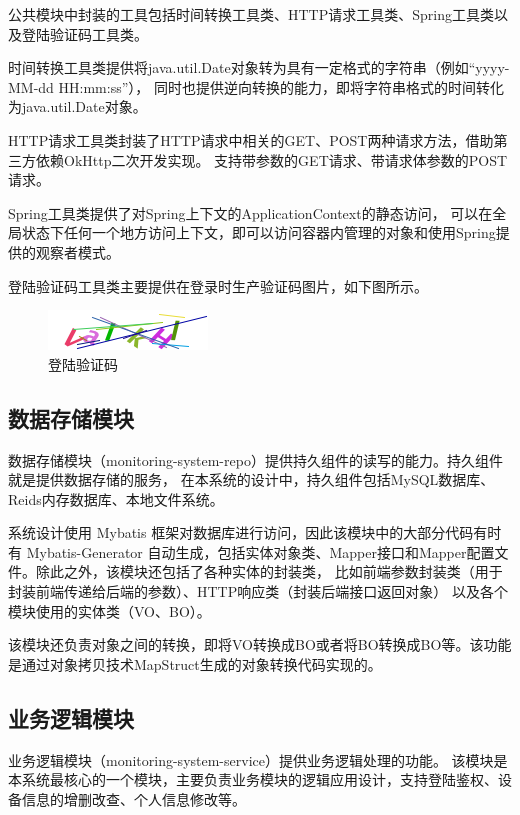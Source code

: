 公共模块中封装的工具包括时间转换工具类、HTTP请求工具类、Spring工具类以及登陆验证码工具类。

时间转换工具类提供将java.util.Date对象转为具有一定格式的字符串（例如“yyyy-MM-dd HH:mm:ss”），
同时也提供逆向转换的能力，即将字符串格式的时间转化为java.util.Date对象。

HTTP请求工具类封装了HTTP请求中相关的GET、POST两种请求方法，借助第三方依赖OkHttp二次开发实现。
支持带参数的GET请求、带请求体参数的POST请求。

Spring工具类提供了对Spring上下文的ApplicationContext的静态访问，
可以在全局状态下任何一个地方访问上下文，即可以访问容器内管理的对象和使用Spring提供的观察者模式。

登陆验证码工具类主要提供在登录时生产验证码图片，如下图所示。

\begin{figure}[ht]
    \centering
    \includegraphics[width=0.5\linewidth]{./Figure/IMG_code.png}
    \caption{登陆验证码}\label{Fig:code}
\end{figure}

\subsection{数据存储模块}
数据存储模块（monitoring-system-repo）提供持久组件的读写的能力。持久组件就是提供数据存储的服务，
在本系统的设计中，持久组件包括MySQL数据库、Reids内存数据库、本地文件系统。

系统设计使用 Mybatis 框架对数据库进行访问，因此该模块中的大部分代码有时有 Mybatis-Generator
自动生成，包括实体对象类、Mapper接口和Mapper配置文件。除此之外，该模块还包括了各种实体的封装类，
比如前端参数封装类（用于封装前端传递给后端的参数）、HTTP响应类（封装后端接口返回对象）
以及各个模块使用的实体类（VO、BO）。

该模块还负责对象之间的转换，即将VO转换成BO或者将BO转换成BO等。该功能是通过对象拷贝技术MapStruct生成的对象转换代码实现的。

\subsection{业务逻辑模块}
业务逻辑模块（monitoring-system-service）提供业务逻辑处理的功能。
该模块是本系统最核心的一个模块，主要负责业务模块的逻辑应用设计，支持登陆鉴权、设备信息的增删改查、个人信息修改等。

